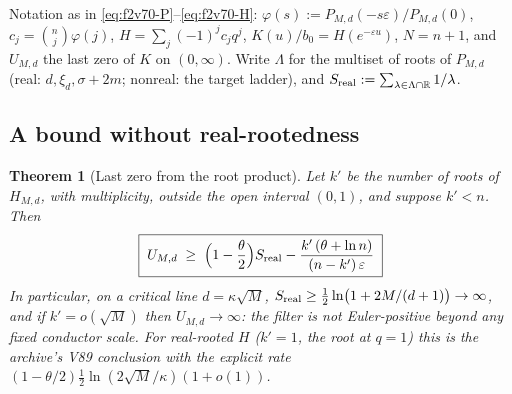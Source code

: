\documentclass[11pt]{article}
\newtheorem{theorem}{Theorem}[section]
\theoremstyle{definition}
\theoremstyle{remark}
\begin{document}
Notation as in \eqref{eq:f2v70-P}--\eqref{eq:f2v70-H}:
\(\varphi(s):=P_{M,d}(-s\varepsilon)/P_{M,d}(0)\), \(c_j=\binom nj\varphi(j)\),
\(H=\sum_j(-1)^jc_jq^j\), \(K(u)/b_0=H(e^{-\varepsilon u})\), \(N=n+1\),
and \(U_{M,d}\) the last zero of \(K\) on \((0,\infty)\).  Write
\(\Lambda\) for the multiset of roots of \(P_{M,d}\) (real:
\(d,\xi_d,\sigma+2m\); nonreal: the target ladder), and
\(S_{\rm real}:=\sum_{\lambda\in\Lambda\cap\mathbb R}1/\lambda\).

\subsection{A bound without real-rootedness}

\begin{theorem}[Last zero from the root product]
\label{thm:f2v71-product}
Let \(k'\) be the number of roots of \(H_{M,d}\), with multiplicity,
outside the open interval \((0,1)\), and suppose \(k'<n\).  Then
\begin{equation}
 \boxed{\;U_{M,d}\;\ge\;\Bigl(1-\frac\theta2\Bigr)S_{\rm real}
 -\frac{k'\,(\theta+\ln n)}{(n-k')\,\varepsilon}\;}
 \label{eq:f2v71-bound}
\end{equation}
In particular, on a critical line \(d=\kappa\sqrt M\),
\(S_{\rm real}\ge\tfrac12\ln\bigl(1+2M/(d+1)\bigr)\to\infty\), and if
\(k'=o(\sqrt M)\) then \(U_{M,d}\to\infty\): the filter is not
Euler-positive beyond any fixed conductor scale.  For real-rooted \(H\)
(\(k'=1\), the root at \(q=1\)) this is the archive's V89 conclusion with
the explicit rate \((1-\theta/2)\tfrac12\ln(2\sqrt M/\kappa)(1+o(1))\).
\end{theorem}
\end{document}
